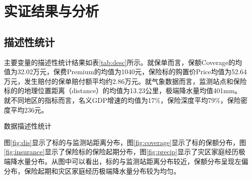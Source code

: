 \chapter{实证结果与分析}\label{chap:4}
\section{描述性统计}
主要变量的描述性统计结果如表\ref{tab:desc}所示。就保单而言，保额Coverage的均值为32.02万元，保费Premium的均值为1040元，保险标的购置价Price均值为52.64万元，发生赔付的保单赔付额平均约2.86万元。就气象数据而言，监测站点和保险标的的地理位置距离（distance）的均值为13.23公里，极端降水量均值401mm。就不同地区的指标而言，名义GDP增速的均值为17\%，保险深度平均79\%，保险密度平均236元。

\begin{table}[H]
    \caption{数据描述性统计}\label{tab:desc}
    \centering
    
\end{table}

图\ref{fig:dis}显示了标的与监测站距离分布，图\ref{fig:coverage}显示了标的保额分布，图\ref{fig:insurance}显示了保险标的保险起期分布，图\ref{fig:precip}显示了灾区家庭经历极端降水量分布。从图中可以看出，标的与监测站距离分布较近，保额分布呈现左偏分布，保险起期和灾区家庭经历极端降水量分布较为均匀。

